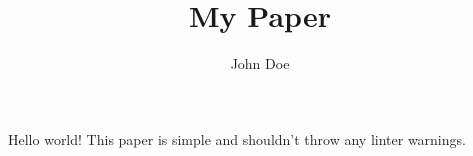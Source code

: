 \documentclass{article}
\author{John Doe}
\begin{document}
\title{My Paper}
\maketitle

Hello world! This paper is simple and shouldn't throw any linter warnings.
\end{document}
